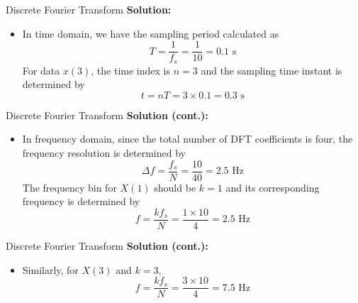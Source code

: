 \documentclass[pdflatex,compress,mathserif]{beamer}
\begin{document}
\begin{frame}{Discrete Fourier Transform}
    \textbf{Solution:}\\
    \begin{itemize}
        \item In time domain, we have the sampling period calculated as
        \begin{equation*}
            T = \frac{1}{f_s} = \frac{1}{10} = 0.1 \text{ s}
        \end{equation*}
        For data $x(3)$, the time index is $n = 3$ and the sampling time instant is determined by
        \begin{equation*}
            t = nT = 3 \times 0.1 = 0.3 \text{ s}
        \end{equation*}
    \end{itemize}
\end{frame}

\begin{frame}{Discrete Fourier Transform}
    \textbf{Solution (cont.):}\\
    \begin{itemize}
        \item In frequency domain, since the total number of DFT coefficients is four, the frequency resolution is determined by
        \begin{equation*}
            \Delta f = \frac{f_s}{N} = \frac{10}{40} = 2.5 \text{ Hz}
        \end{equation*}
        The frequency bin for $X(1)$ should be $k = 1$ and its corresponding frequency is determined by
        \begin{equation*}
            f = \frac{k f_s}{N} = \frac{1 \times 10}{4} = 2.5 \text{ Hz}
        \end{equation*}
    \end{itemize}
\end{frame}

\begin{frame}{Discrete Fourier Transform}
    \textbf{Solution (cont.):}\\
    \begin{itemize}
        \item[] Similarly, for $X(3)$ and $k = 3$,
        \begin{equation*}
            f = \frac{k f_s}{N} = \frac{3 \times 10}{4} = 7.5 \text{ Hz}
        \end{equation*}
    \end{itemize}
    \vfill
\end{frame}
\end{document}
